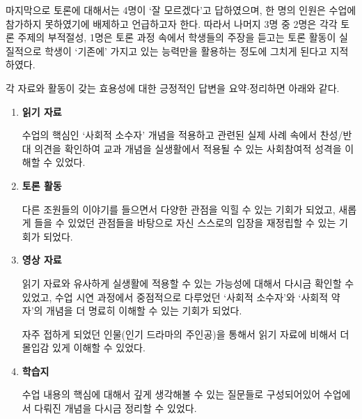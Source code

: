\documentclass[10pt, a4paper, chapter]{oblivoir}
\begin{document}
마지막으로 토론에 대해서는 4명이 `잘 모르겠다'고 답하였으며, 한 명의 인원은 수업에 참가하지 못하였기에 배제하고 언급하고자 한다. 따라서 나머지 3명 중 2명은 각각 토론 주제의 부적절성, 1명은
토론 과정 속에서 학생들의 주장을 듣고는 토론 활동이 실질적으로 학생이 `기존에' 가지고 있는 능력만을 활용하는 정도에 그치게 된다고 지적하였다. \newline

\noindent
각 자료와 활동이 갖는 효용성에 대한 긍정적인 답변을 요약$\cdot$정리하면 아래와 같다. 
\begin{enumerate}
    \item \textbf{읽기 자료}
    
    수업의 핵심인 `사회적 소수자' 개념을 적용하고 관련된 실제 사례 속에서 찬성/반대 의견을 확인하여 교과 개념을 실생활에서 적용될 수 있는 
    사회참여적 성격을 이해할 수 있었다. 
    \item \textbf{토론 활동}
    
    다른 조원들의 이야기를 들으면서 다양한 관점을 익힐 수 있는 기회가 되었고, 새롭게 들을 수 있었던 관점들을 바탕으로 
    자신 스스로의 입장을 재정립할 수 있는 기회가 되었다. 
    \item \textbf{영상 자료}
    
    읽기 자료와 유사하게 실생활에 적용할 수 있는 가능성에 대해서 다시금 확인할 수 있었고, 수업 시연 과정에서 중점적으로 다루었던 
    `사회적 소수자'와 `사회적 약자'의 개념을 더 명료히 이해할 수 있는 기회가 되었다. 

    자주 접하게 되었던 인물(인기 드라마의 주인공)을 통해서 읽기 자료에 비해서 더 몰입감 있게 이해할 수 있었다. 
    \item \textbf{학습지}
    
    수업 내용의 핵심에 대해서 깊게 생각해볼 수 있는 질문들로 구성되어있어 수업에서 다뤄진 개념을 다시금 정리할 수 있었다. 
\end{enumerate}



\end{document}

